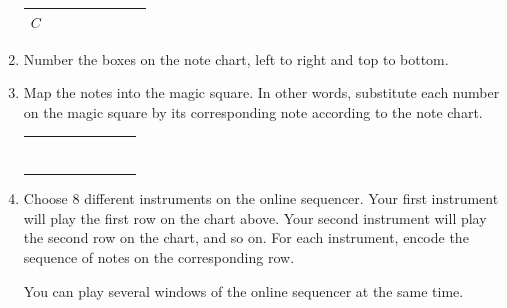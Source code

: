 \documentclass[12pt,noauthor,nooutcomes,hints,instructornotes]{ximera}%
\begin{document}
\begin{question}
\begin{enumerate}
\begin{center}
\begin{tabular}{|c|c|c|c|c|c|c|c|}
$C$ & \hspace{20 pt} & \hspace{20 pt} & \hspace{20 pt} & \hspace{20 pt} & \hspace{20 pt} & \hspace{20 pt} & \hspace{20 pt} \\\hline
\end{tabular}
\end{center}

\item Number the boxes on the note chart, left to right and top to bottom.

\item Map the notes into the magic square. In other words, substitute each number on the magic square by its corresponding note according to the note chart.

\begin{center}
    \renewcommand{\arraystretch}{3}
\begin{tabular}{|c|c|c|c|c|c|c|c|}\hline
\hspace{30 pt} & \hspace{30 pt} & \hspace{30 pt} & \hspace{30 pt} & \hspace{30 pt} & \hspace{30 pt} & \hspace{30 pt} & \hspace{30 pt} \\\hline
&&&&&&&\\\hline
&&&&&&&\\\hline
&&&&&&&\\\hline
&&&&&&&\\\hline
&&&&&&&\\\hline
&&&&&&&\\\hline
&&&&&&&\\\hline
\end{tabular}
\end{center}

\item Choose 8 different instruments on the online sequencer. Your first instrument will play the first row on the chart above. Your second instrument will play the second row on the chart, and so on. For each instrument, encode the sequence of notes on the corresponding row.
\begin{hint}
You can play several windows of the online sequencer at the same time.
\end{hint}


\end{enumerate}
\end{question}
\end{document}
